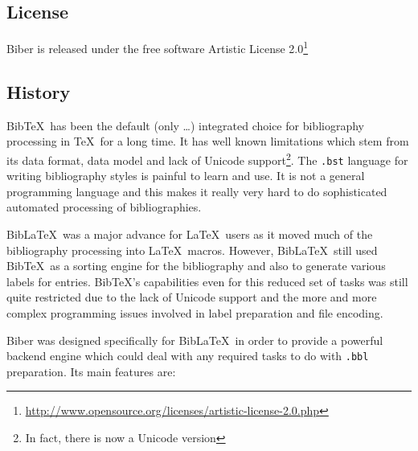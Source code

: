 \documentclass{ltxdockit}
\begin{document}
\subsection{License}

Biber is released under the free software Artistic License 2.0\footnote{\url{http://www.opensource.org/licenses/artistic-license-2.0.php}}

\subsection{History}

Bib\TeX\ has been the default (only \ldots) integrated choice for
bibliography processing in \TeX\ for a long time. It has well known
limitations which stem from its data format, data model and lack of Unicode
support\footnote{In fact, there is now a Unicode version}. The
\verb+.bst+ language for writing bibliography styles is painful to learn
and use. It is not a general programming language and this makes it really
very hard to do sophisticated automated processing of bibliographies.

Bib\LaTeX\ was a major advance for \LaTeX\ users as it moved much
of the bibliography processing into \LaTeX\ macros. However,
Bib\LaTeX\ still used Bib\TeX\ as a sorting engine for the
bibliography and also to generate various labels for
entries. Bib\TeX's capabilities even for this reduced set of
tasks was still quite restricted due to the lack of Unicode support and
the more and more complex programming issues involved in label
preparation and file encoding.

Biber was designed specifically for Bib\LaTeX\ in order to
provide a powerful backend engine which could deal with any required
tasks to do with \verb+.bbl+ preparation. Its main features are:
\end{document}
